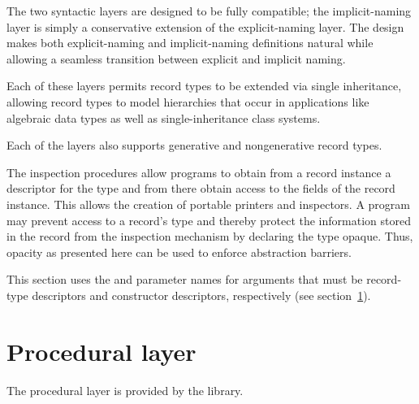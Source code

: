 The two syntactic layers are designed to be fully compatible; the
implicit-naming layer is simply a conservative extension of the
explicit-naming layer.  The design makes both explicit-naming and
implicit-naming definitions natural while allowing a seamless
transition between explicit and implicit naming.

Each of these layers permits record types to be extended via single
inheritance, allowing record types to model hierarchies that occur in
applications like algebraic data types as well as single-inheritance class
systems.

Each of the layers also supports generative and nongenerative record types.

The inspection procedures allow programs to obtain from a record instance a
descriptor for the type and from there obtain access to the fields of the
record instance. This allows the creation of portable printers and inspectors.
A program may prevent access to a record's type and thereby protect the
information stored in the record from the inspection mechanism by declaring the
type opaque. Thus, opacity as presented here can be used to enforce abstraction
barriers.

This section uses the  and 
parameter names for arguments that must be record-type descriptors
and constructor descriptors, respectively (see
section~\ref{recordsproceduralsection}).

\section{Procedural layer}
\label{recordsproceduralsection}

The procedural layer is provided by the  library.

